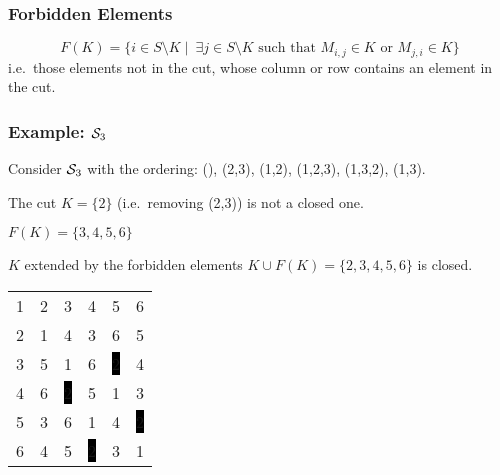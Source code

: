 \documentclass{beamer}
\newcommand{\cS}{{\cal S}}
\begin{document}
\begin{frame}\frametitle{Forbidden Elements}

\begin{definition}
$$F(K)=\{i\in S\setminus K \mid\ \exists j\in S\setminus K \text{ such that } M_{i,j}\in K \text{ or } M_{j,i}\in K\} $$
\noindent i.e.\ those elements not in the cut, whose column or row contains an element in the cut.
\end{definition}

\end{frame}

\begin{frame}\frametitle{Example: $\cS_3$}
Consider $\cS_3$ with the ordering:  (), (2,3), (1,2), (1,2,3), (1,3,2), (1,3).

The cut $K=\{2\}$ (i.e.\ removing (2,3)) is not a closed one. 

$F(K)=\{3,4,5,6\}$

$K$ extended by the forbidden elements  $K\cup F(K)=\{2,3,4,5,6\}$ is closed.

\begin{center}
\setlength{\fboxsep}{1pt}
\begin{tabular}{cccccc}
1&\color{lgr}2&3&4&5&6\\
\color{lgr}2&\color{lgr}1&\color{lgr}4&\color{lgr}3&\color{lgr}6&\color{lgr}5\\
3&\color{lgr}5&1&6&\color{white}\colorbox{black}{2}&4\\
4&\color{lgr}6&\color{white}\colorbox{black}{2}&5&1&3\\
5&\color{lgr}3&6&1&4&\color{white}\colorbox{black}{2}\\
6&\color{lgr}4&5&\color{white}\colorbox{black}{2}&3&1\\
\end{tabular}
\end{center}
\end{frame}
\end{document}
